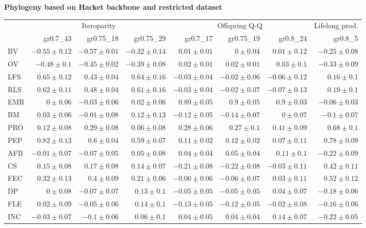 \begin{landscape}
\begin{table}
\begin{footnotesize}
\textbf{Phylogeny based on Hacket backbone and restricted dataset}

\begin{tabular}{@{}l|rrr|rrr|r@{}}
\toprule
 & \multicolumn{3}{c|}{Iteroparity} & \multicolumn{3}{c|}{Offspring Q-Q} & \multicolumn{1}{c}{Lifelong prod.}\\
 & gr0.7\_43 & gr0.75\_18 & gr0.75\_29 & gr0.7\_17 & gr0.75\_19 & gr0.8\_24 & gr0.8\_5\\
\midrule
BV & $-0.55 \pm 0.12$ & $-0.57 \pm 0.01$ & $-0.32 \pm 0.14$ & $0.01 \pm 0.01$ & $0 \pm 0.04$ & $0.01 \pm 0.12$ & $-0.25 \pm 0.08$\\
OV & $-0.48 \pm 0.1$ & $-0.45 \pm 0.02$ & $-0.39 \pm 0.08$ & $0.02 \pm 0.01$ & $0.02 \pm 0.01$ & $0.03 \pm 0.1$ & $-0.33 \pm 0.09$\\
LFS & $0.65 \pm 0.12$ & $0.43 \pm 0.04$ & $0.64 \pm 0.16$ & $-0.03 \pm 0.04$ & $-0.02 \pm 0.06$ & $-0.06 \pm 0.12$ & $0.16 \pm 0.1$\\
RLS & $0.62 \pm 0.11$ & $0.48 \pm 0.04$ & $0.61 \pm 0.16$ & $-0.03 \pm 0.04$ & $-0.02 \pm 0.07$ & $-0.07 \pm 0.13$ & $0.19 \pm 0.1$\\
EMR & $0 \pm 0.06$ & $-0.03 \pm 0.06$ & $0.02 \pm 0.06$ & $0.89 \pm 0.05$ & $0.9 \pm 0.05$ & $0.9 \pm 0.03$ & $-0.06 \pm 0.03$\\
BM & $0.03 \pm 0.06$ & $-0.01 \pm 0.08$ & $0.12 \pm 0.13$ & $-0.12 \pm 0.05$ & $-0.14 \pm 0.07$ & $0 \pm 0.07$ & $-0.1 \pm 0.07$\\
PRO & $0.12 \pm 0.08$ & $0.29 \pm 0.08$ & $0.06 \pm 0.08$ & $0.28 \pm 0.06$ & $0.27 \pm 0.1$ & $0.41 \pm 0.09$ & $0.68 \pm 0.1$\\
PEP & $0.82 \pm 0.13$ & $0.6 \pm 0.04$ & $0.59 \pm 0.07$ & $0.11 \pm 0.02$ & $0.12 \pm 0.02$ & $0.07 \pm 0.11$ & $0.78 \pm 0.09$\\
AFB & $-0.01 \pm 0.07$ & $-0.07 \pm 0.05$ & $0.05 \pm 0.08$ & $0.04 \pm 0.04$ & $0.05 \pm 0.04$ & $0.11 \pm 0.1$ & $-0.22 \pm 0.09$\\
CS & $0.15 \pm 0.08$ & $0.17 \pm 0.08$ & $0.14 \pm 0.07$ & $-0.21 \pm 0.08$ & $-0.22 \pm 0.08$ & $-0.03 \pm 0.11$ & $0.42 \pm 0.11$\\
FEC & $0.32 \pm 0.13$ & $0.4 \pm 0.09$ & $0.21 \pm 0.06$ & $-0.06 \pm 0.06$ & $-0.06 \pm 0.07$ & $0.03 \pm 0.11$ & $0.52 \pm 0.12$\\
DP & $0 \pm 0.08$ & $-0.07 \pm 0.07$ & $0.13 \pm 0.1$ & $-0.05 \pm 0.05$ & $-0.05 \pm 0.05$ & $0.04 \pm 0.07$ & $-0.18 \pm 0.06$\\
FLE & $0.02 \pm 0.09$ & $-0.05 \pm 0.06$ & $0.14 \pm 0.1$ & $-0.13 \pm 0.05$ & $-0.12 \pm 0.05$ & $-0.02 \pm 0.08$ & $-0.16 \pm 0.06$\\
INC & $-0.03 \pm 0.07$ & $-0.1 \pm 0.06$ & $0.06 \pm 0.1$ & $0.04 \pm 0.05$ & $0.04 \pm 0.04$ & $0.14 \pm 0.07$ & $-0.22 \pm 0.05$\\
\bottomrule
\end{tabular}

\end{footnotesize}
\end{table}
\end{landscape}


